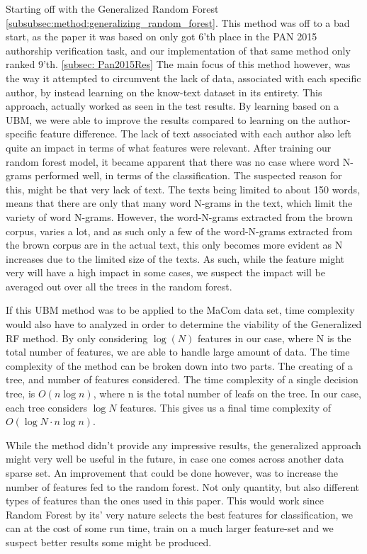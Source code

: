 Starting off with the Generalized Random Forest
\ref{subsubsec:method:generalizing_random_forest}. This method was off to a bad
start, as the paper it was based on \cite{pacheco2015} only got 6'th place in
the PAN 2015 authorship verification task, and our implementation of that same
method only ranked 9'th. \ref{subsec: Pan2015Res} The main focus of this method
however, was the way it attempted to circumvent the lack of data, associated
with each specific author, by instead learning on the know-text dataset in
its entirety. This approach, actually worked as seen in the test results. By
learning based on a \gls{UBM}, we were able to improve the results compared to
learning on the author-specific feature difference. The lack of text associated
with each author also left quite an impact in terms of what features were
relevant. After training our random forest model, it became apparent that there
was no case where word N-grams performed well, in terms of the classification.
The suspected reason for this, might be that very lack of text. The texts being
limited to about 150 words, means that there are only that many word N-grams in
the text, which limit the variety of word N-grams. However, the word-N-grams
extracted from the brown corpus, varies a lot, and as such only a few of the
word-N-grams extracted from the brown corpus are in the actual text, this only
becomes more evident as N increases due to the limited size of the texts. As
such, while the feature might very will have a high impact in some cases, we
suspect the impact will be averaged out over all the trees in the random forest.

If this \gls{UBM} method was to be applied to the MaCom data set, time
complexity would also have to analyzed in order to determine the viability of
the Generalized RF method. By only considering $\log(N)$ features in our case,
where N is the total number of features, we are able to handle large amount of
data. The time complexity of the method can be broken down into two parts. The
creating of a tree, and number of features considered. The time complexity of a
single decision tree, is $O(n \log{n})$, where n is the total number of leafs on
the tree. In our case, each tree considers $\log{N}$ features. This gives us a
final time complexity of $O(\log{N} \cdot n \log{n})$.\cite{RFTime}

While the method didn't provide any impressive results, the generalized approach
might very well be useful in the future, in case one comes across another data
sparse set. An improvement that could be done however, was to increase the
number of features fed to the random forest. Not only quantity, but also
different types of features than the ones used in this paper. This would
work since Random Forest by its' very nature selects the best features for
classification, we can at the cost of some run time, train on a much larger
feature-set and we suspect better results some might be produced.

